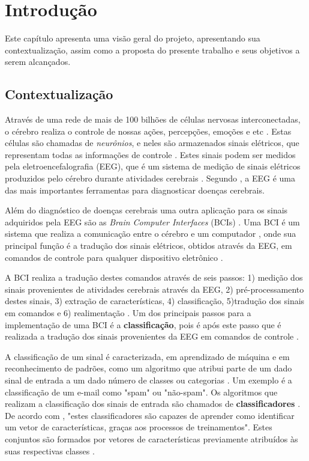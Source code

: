 \chapter[Introdução]{Introdução}

Este capítulo apresenta uma visão geral do projeto, apresentando sua contextualização, assim como a proposta do presente trabalho e seus objetivos a serem alcançados.

\section{Contextualização}

Através de uma rede de mais de 100 bilhões de células nervosas interconectadas, o cérebro
realiza o controle de nossas ações, percepções, emoções e etc \cite{KANDEL}. Estas células
são chamadas de \textit{neurônios}, e neles são armazenados sinais elétricos, que representam
todas as informações de controle \cite{Siulybook}. Estes sinais podem ser medidos pela
eletroencefalografia (EEG), que é um sistema de medição de sinais elétricos produzidos pelo
cérebro durante atividades cerebrais \cite{F.Lotte}. Segundo \cite{SIULYDissertacao}, a EEG
é uma das mais importantes ferramentas para diagnosticar doenças cerebrais.

Além do diagnóstico de doenças cerebrais uma outra aplicação para os sinais adquiridos
pela EEG são as \textit{Brain Computer Interfaces} (BCIs) \cite{F.Lotte}. Uma BCI é um
sistema que realiza a comunicação entre o cérebro e um computador \cite{Siulybook}, onde
sua principal função é a tradução dos sinais elétricos, obtidos através da EEG, em comandos
de controle para qualquer dispositivo eletrônico \cite{Siulybook}.

A BCI realiza a tradução destes comandos através de seis passos: 1) medição dos sinais
provenientes de atividades cerebrais através da EEG, 2) pré-processamento destes sinais,
3) extração de características, 4) classificação, 5)tradução dos sinais em comandos e 6)
realimentação \cite{MasonAndBirch}. Um dos principais passos para a implementação de uma
BCI é a \textbf{classificação}, pois é após este passo que é realizada a tradução dos sinais provenientes da EEG
em comandos de controle \cite{MasonAndBirch}.

A classificação de um sinal é caracterizada, em aprendizado de máquina e em reconhecimento de
padrões, como um algoritmo que atribui parte de um dado sinal de entrada a um dado número de
classes ou categorias \cite{brunelli2009template}. Um exemplo é a classificação de um e-mail
como "spam" ou "não-spam". Os algoritmos que realizam a classificação dos sinais de entrada são
chamados de \textbf{classificadores} \cite{Siulybook}. De acordo com \cite[p. 41]{lottephd}, "estes
classificadores são capazes de aprender como identificar um vetor de características, graças
aos processos de treinamentos". Estes conjuntos são formados por vetores de características
previamente atribuídos às suas respectivas classes \cite{lottephd}.

